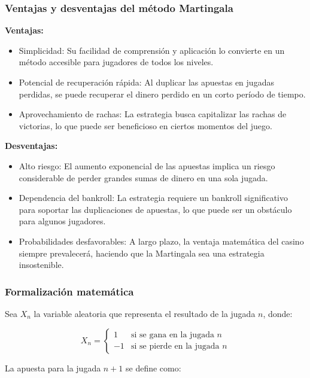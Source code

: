 \documentclass{article}
\begin{document}
\subsubsection{Ventajas y desventajas del método Martingala}

\textbf{Ventajas:}

\begin{itemize}
    \item Simplicidad: Su facilidad de comprensión y aplicación lo convierte en un método accesible para jugadores de todos los niveles.
    \item Potencial de recuperación rápida: Al duplicar las apuestas en jugadas perdidas, se puede recuperar el dinero perdido en un corto período de tiempo.
    \item Aprovechamiento de rachas: La estrategia busca capitalizar las rachas de victorias, lo que puede ser beneficioso en ciertos momentos del juego.
\end{itemize}

\textbf{Desventajas:}

\begin{itemize}
    \item Alto riesgo: El aumento exponencial de las apuestas implica un riesgo considerable de perder grandes sumas de dinero en una sola jugada.
    \item Dependencia del bankroll: La estrategia requiere un bankroll significativo para soportar las duplicaciones de apuestas, lo que puede ser un obstáculo para algunos jugadores.
    \item Probabilidades desfavorables: A largo plazo, la ventaja matemática del casino siempre prevalecerá, haciendo que la Martingala sea una estrategia insostenible.
\end{itemize}

\subsubsection{Formalización matemática}

Sea $X_n$ la variable aleatoria que representa el resultado de la jugada $n$, donde:

\[ X_n = \begin{cases} 
1 & \text{si se gana en la jugada } n \\
-1 & \text{si se pierde en la jugada } n 
\end{cases} \]

La apuesta para la jugada $n+1$ se define como:
\end{document}
